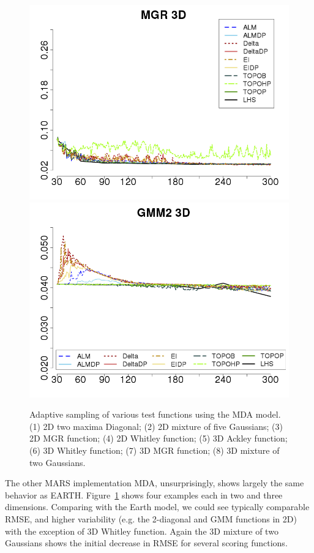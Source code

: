\begin{figure}[htbp]
\begin{center}
  \includegraphics[width=0.24\linewidth]{figs/chap5/mda_MGR_td=30}
  \includegraphics[width=0.24\linewidth]{figs/chap5/mda_GMM2_3D_td=30}
\caption{Adaptive sampling of various test functions using the MDA model.
(1) 2D two maxima Diagonal;
(2) 2D mixture of five Gaussians;
(3) 2D MGR function;
(4) 2D Whitley function;
(5) 3D Ackley function;
(6) 3D Whitley function;
(7) 3D MGR function;
(8) 3D mixture of two Gaussians.}
\label{fig:mda}
\end{center}
\end{figure}

The other MARS implementation MDA, unsurprisingly, shows largely the same behavior as EARTH.
%
Figure~\ref{fig:mda} shows four examples each in two and three dimensions.
%
Comparing with the Earth model, we could see typically comparable RMSE, and higher variability (e.g. the 2-diagonal and GMM functions in 2D) with the exception of 3D Whitley function.
%
Again the 3D mixture of two Gaussians shows the initial decrease in RMSE for several scoring functions.

